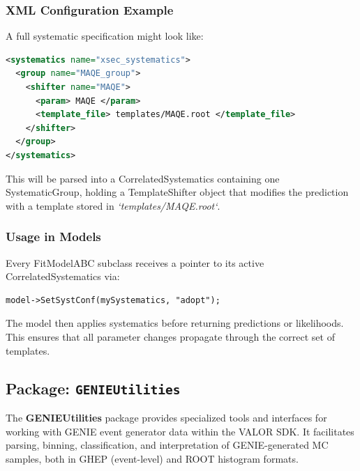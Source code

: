 \vspace{1em}
\subsubsection*{XML Configuration Example}

A full systematic specification might look like:

\begin{lstlisting}[language=xml]
<systematics name="xsec_systematics">
  <group name="MAQE_group">
    <shifter name="MAQE">
      <param> MAQE </param>
      <template_file> templates/MAQE.root </template_file>
    </shifter>
  </group>
</systematics>
\end{lstlisting}

\vspace{0.5em}
This will be parsed into a {\color{cadmiumgreen} CorrelatedSystematics} containing one {\color{cadmiumgreen} SystematicGroup}, holding a {\color{cadmiumgreen} TemplateShifter} object that modifies the prediction with a template stored in {\it`templates/MAQE.root`}.

\vspace{1em}
\subsubsection*{Usage in Models}

Every {\color{cadmiumgreen} FitModelABC} subclass receives a pointer to its active {\color{cadmiumgreen} CorrelatedSystematics} via:

\begin{lstlisting}
model->SetSystConf(mySystematics, "adopt");
\end{lstlisting}

The model then applies systematics before returning predictions or likelihoods.  
This ensures that all parameter changes propagate through the correct set of templates.

%
%
%

\subsection{Package: \texttt{GENIEUtilities}}

The {\color{cadmiumgreen} \textbf{GENIEUtilities}} package provides specialized tools and interfaces for working with GENIE event generator data within the VALOR SDK.  
It facilitates parsing, binning, classification, and interpretation of GENIE-generated MC samples, both in GHEP (event-level) and ROOT histogram formats.

